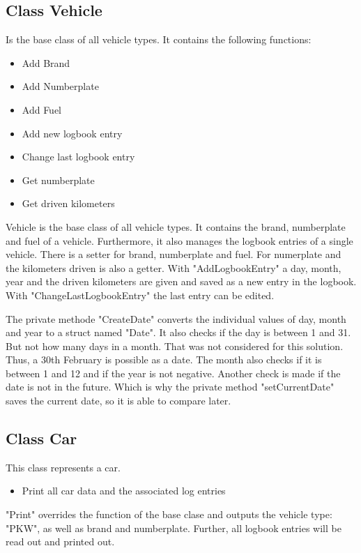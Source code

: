 \subsection{Class Vehicle}
Is the base class of all vehicle types.
It contains the following functions:
\begin{itemize}
	\item Add Brand
	\item Add Numberplate
	\item Add Fuel
	\item Add new logbook entry
	\item Change last logbook entry
	\item Get numberplate
	\item Get driven kilometers
\end{itemize}

Vehicle is the base class of all vehicle types. It contains the brand, numberplate and fuel of a vehicle.
Furthermore, it also manages the logbook entries of a single vehicle.
There is a setter for brand, numberplate and fuel. For numerplate and the kilometers driven is also a getter.
With "AddLogbookEntry" a day, month, year and the driven kilometers are given and saved as a new entry in the logbook.
With "ChangeLastLogbookEntry" the last entry can be edited.

The private methode "CreateDate" converts the individual values of day, month and year to a struct named "Date".
It also checks if the day is between 1 and 31. But not how many days in a month. That was
not considered for this solution. Thus, a 30th February is possible as a date.
The month also checks if it is between 1 and 12 and if the year is not negative.
Another check is made if the date is not in the future. Which is why the private method "setCurrentDate" saves the current date, so it
is able to compare later.

\subsection{Class Car}
This class represents a car.
\begin{itemize}
	\item Print all car data and the associated log entries
\end{itemize}

"Print" overrides the function of the base clase and outputs the vehicle type: "PKW", as well as brand and numberplate.
Further, all logbook entries will be read out and printed out.

